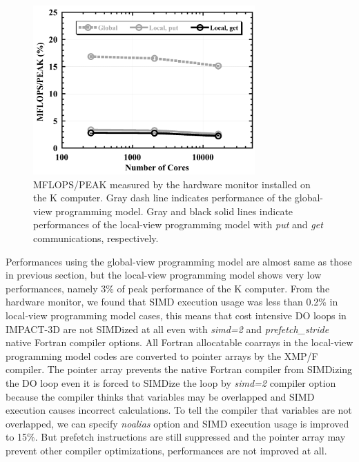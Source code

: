 \documentclass[graybox]{svmult}
\begin{document}
\begin{figure}[h]
\begin{center}
\includegraphics[width=8.5cm,bb=0 0 461 352]{fig6-5.png}
\end{center}
\caption{MFLOPS/PEAK measured by the hardware monitor installed on the K computer. Gray dash line indicates performance of the global-view programming model. Gray and black solid lines indicate performances of the local-view programming model with {\it put} and {\it get} communications, respectively.}
\label{fig6-5} 
\end{figure}

Performances using the global-view programming model are almost same as those in previous section, but the local-view programming model shows very low performances, namely 3\% of peak performance of the K computer. From the hardware monitor, we found that SIMD execution usage was less than 0.2\% in local-view programming model cases, this means that cost intensive DO loops in IMPACT-3D are not SIMDized at all even with {\it simd=2} and {\it prefetch\_stride} native Fortran compiler options. All Fortran allocatable coarrays in the local-view programming model codes are converted to pointer arrays by the XMP/F compiler. The pointer array prevents the native Fortran compiler from SIMDizing the DO loop even it is forced to SIMDize the loop by {\it simd=2} compiler option because the compiler thinks that variables may be overlapped and SIMD execution causes incorrect calculations. To tell the compiler that variables are not overlapped, we can specify {\it noalias} option and SIMD execution usage is improved to 15\%. But prefetch instructions are still suppressed and the pointer array may prevent other compiler optimizations, performances are not improved at all.
\end{document}
